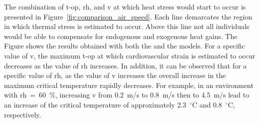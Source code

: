 The combination of \ac{t-op}, \ac{rh}, and \ac{v} at which heat stress would start to occur is presented in Figure~\ref{fig:comparison_air_speed}.
Each line demarcates the region in which thermal stress is estimated to occur.
Above this line not all individuals would be able to compensate for endogenous and exogenous heat gains.
The Figure shows the results obtained with both the  and the  models.
For a specific value of \ac{v}, the maximum \ac{t-op} at which cardiovascular strain is estimated to occur decreases as the value of \ac{rh} increases.
In addition, it can be observed that for a specific value of \ac{rh}, as the value of \ac{v} increases the overall increase in the maximum critical temperature rapidly decreases.
For example, in an environment with \ac{rh}~=~60~\%, increasing \ac{v} from 0.2~m/s to 0.8~m/s then to 4.5~m/s lead to an increase of the critical temperature of approximately 2.3~$^{\circ}$C and 0.8~$^{\circ}$C, respectively.

